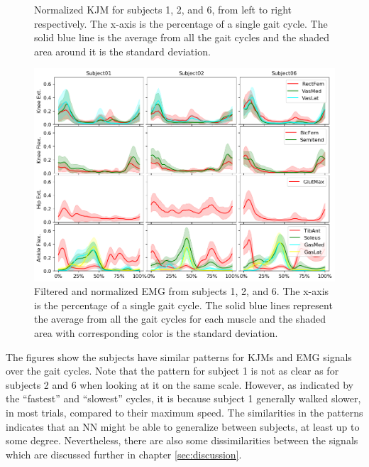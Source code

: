 \documentclass[../main.tex]{subfiles}
\begin{document}
\begin{figure}[ht!]
\begin{subfigure}[b]{0.328\textwidth}
     \end{subfigure}
    \caption{Normalized \ac{KJM} for subjects 1, 2, and 6, from left to right respectively. The x-axis is the percentage of a single gait cycle. The solid blue line is the average from all the gait cycles and the shaded area around it is the standard deviation.}
    \label{fig:kjm-average}
\end{figure}
\begin{figure}[ht!]
    \centering
    \includegraphics[width=\textwidth]{img/results/emg_avg/all_subject_grid_emg_avg.png}
    \caption{Filtered and normalized \ac{EMG} from subjects 1, 2, and 6. The x-axis is the percentage of a single gait cycle. The solid blue lines represent the average from all the gait cycles for each muscle and the shaded area with corresponding color is the standard deviation.}
    \label{fig:emg-average}
\end{figure}
The figures show the subjects have similar patterns for \acp{KJM} and \ac{EMG} signals over the gait cycles.
Note that the pattern for subject 1 is not as clear as for subjects 2 and 6 when looking at it on the same scale.
However, as indicated by the ``fastest'' and ``slowest'' cycles, it is because subject 1 generally walked slower, in most trials, compared to their maximum speed.
The similarities in the patterns indicates that an \ac{NN} might be able to generalize between subjects, at least up to some degree.
Nevertheless, there are also some dissimilarities between the signals which are discussed further in chapter \ref{sec:discussion}.
\end{document}
